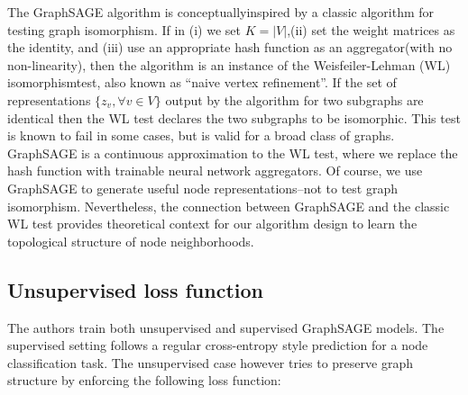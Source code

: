 \documentclass[12pt,a4paper]{article}
\begin{document}
The GraphSAGE algorithm is conceptuallyinspired by a classic algorithm for testing graph isomorphism. If in (i) we set $K=|V|$,(ii) set the weight matrices as the identity, and (iii) use an appropriate hash function as an aggregator(with no non-linearity), then the algorithm is an instance of the Weisfeiler-Lehman (WL) isomorphismtest, also known as “naive vertex refinement”. If the set of representations $\{z_{v},\forall v \in V \} $ output by the algorithm for two subgraphs are identical then the WL test declares the two subgraphs to be isomorphic.  This test is known to fail in some cases, but is valid for a broad class of graphs. GraphSAGE is a continuous approximation to the WL test, where we replace the hash function with trainable neural network aggregators. Of course, we use GraphSAGE to generate useful node representations–not to test graph isomorphism. Nevertheless, the connection between GraphSAGE and the classic WL test provides theoretical context for our algorithm design to learn the topological structure of node neighborhoods.

\subsection*{Unsupervised loss function}

The authors train both unsupervised and supervised GraphSAGE models. The supervised setting follows a regular cross-entropy style prediction for a node classification task. The unsupervised case however tries to preserve graph structure by enforcing the following loss function:
\end{document}
